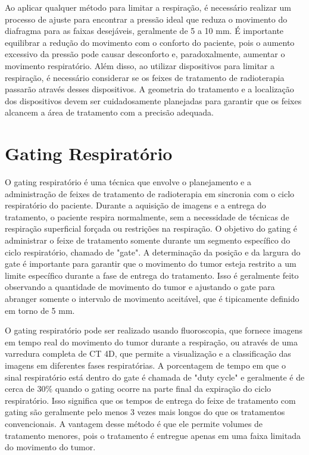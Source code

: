 \documentclass[11pt,a4paper]{article}
\begin{document}
	Ao aplicar qualquer método para limitar a respiração, é necessário realizar um processo de ajuste para encontrar a pressão ideal que reduza o movimento do diafragma para as faixas desejáveis, geralmente de 5 a 10 mm. É importante equilibrar a redução do movimento com o conforto do paciente, pois o aumento excessivo da pressão pode causar desconforto e, paradoxalmente, aumentar o movimento respiratório. Além disso, ao utilizar dispositivos para limitar a respiração, é necessário considerar se os feixes de tratamento de radioterapia passarão através desses dispositivos. A geometria do tratamento e a localização dos dispositivos devem ser cuidadosamente planejadas para garantir que os feixes alcancem a área de tratamento com a precisão adequada.

\section{Gating Respiratório}

	O gating respiratório é uma técnica que envolve o planejamento e a administração de feixes de tratamento de radioterapia em sincronia com o ciclo respiratório do paciente. Durante a aquisição de imagens e a entrega do tratamento, o paciente respira normalmente, sem a necessidade de técnicas de respiração superficial forçada ou restrições na respiração. O objetivo do gating é administrar o feixe de tratamento somente durante um segmento específico do ciclo respiratório, chamado de "gate". A determinação da posição e da largura do gate é importante para garantir que o movimento do tumor esteja restrito a um limite específico durante a fase de entrega do tratamento. Isso é geralmente feito observando a quantidade de movimento do tumor e ajustando o gate para abranger somente o intervalo de movimento aceitável, que é tipicamente definido em torno de 5 mm.

	O gating respiratório pode ser realizado usando fluoroscopia, que fornece imagens em tempo real do movimento do tumor durante a respiração, ou através de uma varredura completa de CT 4D, que permite a visualização e a classificação das imagens em diferentes fases respiratórias. A porcentagem de tempo em que o sinal respiratório está dentro do gate é chamada de "duty cycle" e geralmente é de cerca de 30\% quando o gating ocorre na parte final da expiração do ciclo respiratório. Isso significa que os tempos de entrega do feixe de tratamento com gating são geralmente pelo menos 3 vezes mais longos do que os tratamentos convencionais. A vantagem desse método é que ele permite volumes de tratamento menores, pois o tratamento é entregue apenas em uma faixa limitada do movimento do tumor.
\end{document}
